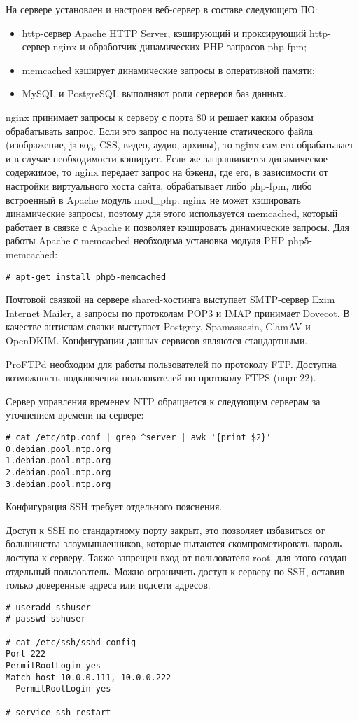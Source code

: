 На сервере установлен и настроен веб-сервер в составе следующего ПО:
\begin{itemize}
  \item http-сервер Apache HTTP Server, кэширующий и проксирующий http-сервер nginx и обработчик динамических PHP-запросов php-fpm;
  \item memcached кэширует динамические запросы в оперативной памяти;
  \item MySQL и PostgreSQL выполняют роли серверов баз данных.
\end{itemize}

nginx принимает запросы к серверу с порта 80 и решает каким образом обрабатывать запрос.
Если это запрос на получение статического файла (изображение, js-код, CSS, видео, аудио, архивы), то nginx сам его обрабатывает и в случае необходимости кэширует.
Если же запрашивается динамическое содержимое, то nginx передает запрос на бэкенд, где его, в зависимости от настройки виртуального хоста сайта, обрабатывает либо php-fpm, либо встроенный в Apache модуль mod\_php.
nginx не может кэшировать динамические запросы, поэтому для этого используется memcached, который работает в связке с Apache и позволяет кэшировать динамические запросы.
Для работы Apache с memcached необходима установка модуля PHP php5-memcached:
\begin{lstlisting}
# apt-get install php5-memcached
\end{lstlisting}

Почтовой связкой на сервере shared-хостинга выступает SMTP-сервер Exim Internet Mailer, а запросы по протоколам POP3 и IMAP принимает Dovecot.
В качестве антиспам-связки выступает Postgrey, Spamassasin, ClamAV и OpenDKIM.
Конфигурации данных сервисов являются стандартными.

ProFTPd необходим для работы пользователей по протоколу FTP.
Доступна возможность подключения пользователей по протоколу FTPS (порт 22).

Сервер управления временем NTP обращается к следующим серверам за уточнением времени на сервере:
\begin{lstlisting}
# cat /etc/ntp.conf | grep ^server | awk '{print $2}'
0.debian.pool.ntp.org
1.debian.pool.ntp.org
2.debian.pool.ntp.org
3.debian.pool.ntp.org
\end{lstlisting}

Конфигурация SSH требует отдельного пояснения.

Доступ к SSH по стандартному порту закрыт, это позволяет избавиться от большинства злоумышленников, которые пытаются скомпрометировать пароль доступа к серверу.
Также запрещен вход от пользователя root, для этого создан отдельный пользователь.
Можно ограничить доступ к серверу по SSH, оставив только доверенные адреса или подсети адресов.
\begin{lstlisting}
# useradd sshuser
# passwd sshuser

# cat /etc/ssh/sshd_config
Port 222
PermitRootLogin yes
Match host 10.0.0.111, 10.0.0.222
  PermitRootLogin yes

# service ssh restart
\end{lstlisting}

